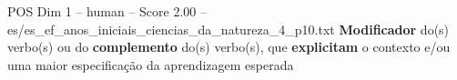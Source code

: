 \begin{textsample}{POS Dim 1 – human – Score 2.00 – es/es\_ef\_anos\_iniciais\_ciencias\_da\_natureza\_4\_p10.txt}  \label{ex:f1_pos_010}
\textbf{Modificador} do(s) verbo(s) ou do \textbf{complemento} do(s) verbo(s), que \textbf{explicitam} o contexto e/ou uma maior especificação da aprendizagem esperada

\end{textsample}
